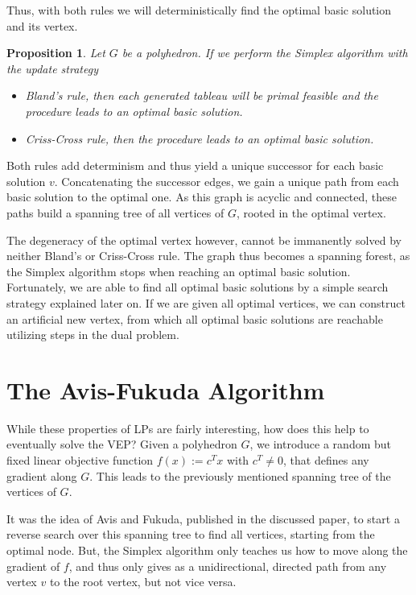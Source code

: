 \documentclass[a4paper, 11pt]{article}
\newtheorem{proposition}{Proposition}
\begin{document}
Thus, with both rules we will deterministically find the optimal basic solution and its vertex. 

\begin{proposition}
	\label{PropoBland}
	Let $G$ be a polyhedron. If we perform the Simplex algorithm with the update strategy
	\begin{itemize}
		\item Bland's rule, then each generated tableau will be primal feasible and the procedure leads to an optimal basic solution.
		\item Criss-Cross rule, then the procedure leads to an optimal basic solution.
	\end{itemize}
\end{proposition}

Both rules add determinism and thus yield a unique successor for each basic solution $v$. Concatenating the successor edges, we gain a unique path from each basic solution to the optimal one. As this graph is acyclic and connected, these paths build a spanning tree of all vertices of $G$, rooted in the optimal vertex. \medskip

The degeneracy of the optimal vertex however, cannot be immanently solved by neither Bland's or Criss-Cross rule. The graph thus becomes a spanning forest, as the Simplex algorithm stops when reaching an optimal basic solution. Fortunately, we are able to find all optimal basic solutions by a simple search strategy explained later on. If we are given all optimal vertices, we can construct an artificial new vertex, from which all optimal basic solutions are reachable utilizing steps in the dual problem.

\section{The Avis-Fukuda Algorithm}

While these properties of LPs are fairly interesting, how does this help to eventually solve the VEP? Given a polyhedron $G$,  we introduce a random but fixed linear objective function $f(x):=c^Tx$ with $c^T\neq 0$, that defines any gradient along $G$. This leads to the previously mentioned spanning tree of the vertices of $G$. \medskip

It was the idea of Avis and Fukuda, published in the discussed paper, to start a reverse search over this spanning tree to find all vertices, starting from the optimal node. But, the Simplex algorithm only teaches us how to move along the gradient of $f$, and thus only gives as a unidirectional, directed path from any vertex $v$ to the root vertex, but not vice versa. \medskip
\end{document}
